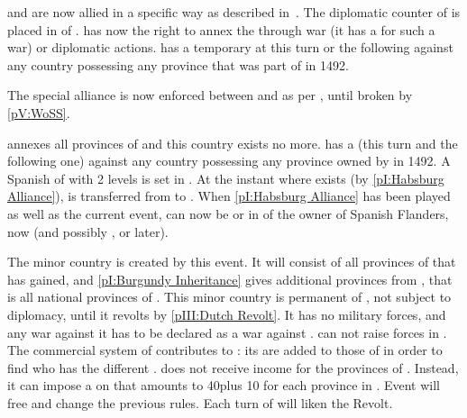 

\phevnt
\aparag \SPA and \HAB are now allied in a specific way as described
in~.  The diplomatic counter of
\HAB is placed in \EG of \SPA.
\aparag \SPA has now the right to annex the \paysprovincesne through war (it
has a \CB for such a war) or diplomatic actions.
\aparag \SPA has a temporary \CB at this turn or the following against any
country possessing any province that was part of \paysBourgogne in 1492.

\effetlong
{} The special alliance is now enforced between \SPA and
\HAB as per , until broken by
\ref{pV:WoSS}.






\phevnt
\aparag \SPA annexes all provinces of \paysBourgogne and this country exists
no more.  \SPA has a \CB (this turn and the following one) against any country
possessing any province owned by \paysBourgogne in 1492.
\aparag A Spanish \MNU of  with 2 levels is set in
\provinceVlaandern.
\aparag At the instant where \paysHollande exists (by \ref{pI:Habsburg
  Alliance}), \provinceZeeland is transferred from \SPA to \paysHollande.
When \ref{pI:Habsburg Alliance} has been played as well as the current event,
\paysLiege can now be \VASSAL or in \ANNEXION of the owner of Spanish
Flanders, \SPA now (and possibly \FRA, \ENG or \AUS later).

\effetlong
{}
\bparag The minor country \paysHollande is created by this event.  It will
consist of all provinces of \paysprovincesne that \SPA has gained, and
\ref{pI:Burgundy Inheritance} gives additional provinces from \paysBourgogne,
that is all national provinces of \paysHollande. This minor country is
permanent \VASSAL of \SPA, not subject to diplomacy, until it revolts by
\ref{pIII:Dutch Revolt}. It has no military forces, and any war against it has
to be declared as a war against \SPA. \SPA can not raise forces in
\paysHollande.
\bparag The commercial system of \paysHollande contributes to \SPA: its
\TradeFLEET are added to those of \SPA in order to find who has the different
\CC.
\bparag \SPA does not receive income for the provinces of \paysHollande.
Instead, it can impose a  on \paysHollande that amounts to
40\ducats plus 10 \ducats for each province in \paysHollande.
\bparag Event  will free \paysHollande and change the
previous rules. Each turn of  will liken the Revolt.



